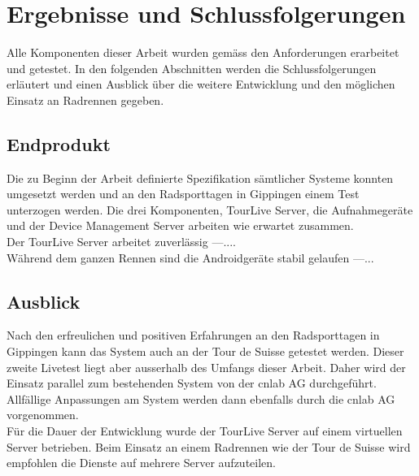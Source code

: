 \chapter{Ergebnisse und Schlussfolgerungen}

Alle Komponenten dieser Arbeit wurden gemäss den Anforderungen erarbeitet und getestet. In den folgenden Abschnitten werden die Schlussfolgerungen erläutert und einen Ausblick über die weitere Entwicklung und den möglichen Einsatz an Radrennen gegeben.

\section{Endprodukt}
Die zu Beginn der Arbeit definierte Spezifikation sämtlicher Systeme konnten umgesetzt werden und an den Radsporttagen in Gippingen einem Test unterzogen werden. Die drei Komponenten, TourLive Server, die Aufnahmegeräte und der Device Management Server arbeiten wie erwartet zusammen.
\\

Der TourLive Server arbeitet zuverlässig ---....
\\

Während dem ganzen Rennen sind die Androidgeräte stabil gelaufen ---...
\\

\section{Ausblick}
Nach den erfreulichen und positiven Erfahrungen an den Radsporttagen in Gippingen kann das System auch an der Tour de Suisse getestet werden. Dieser zweite Livetest liegt aber ausserhalb des Umfangs dieser Arbeit. Daher wird der Einsatz parallel zum bestehenden System von der cnlab AG durchgeführt. Allfällige Anpassungen am System werden dann ebenfalls durch die cnlab AG vorgenommen.
\\

Für die Dauer der Entwicklung wurde der TourLive Server auf einem virtuellen Server betrieben. Beim Einsatz an einem Radrennen wie der Tour de Suisse wird empfohlen die Dienste auf mehrere Server aufzuteilen.
